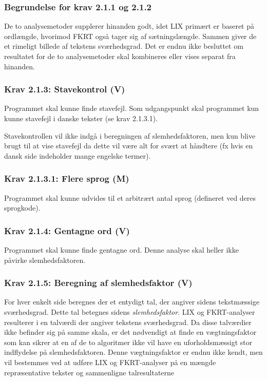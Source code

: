 \documentclass[a4paper,oneside,article]{memoir}
\begin{document}
\subsubsection{Begrundelse for krav 2.1.1 og 2.1.2}
De to analysemetoder supplerer hinanden godt, idet LIX primært er
baseret på ordlængde, hvorimod FKRT også tager sig af
sætningslængde. Sammen giver de et rimeligt billede af tekstens
sværhedsgrad. Det er endnu ikke besluttet om resultatet for de to
analysemetoder skal kombineres eller vises separat fra hinanden.

\subsubsection{Krav 2.1.3: Stavekontrol (V)}
Programmet skal kunne finde stavefejl. Som udgangspunkt skal
programmet kun kunne stavefejl i danske tekster (se krav 2.1.3.1).

Stavekontrollen vil ikke indgå i beregningen af slemhedsfaktoren, men kun
blive brugt til at vise stavefejl da dette vil være alt for
svært at håndtere (fx hvis en dansk side indeholder mange
engelske termer).

\subsubsection{Krav 2.1.3.1: Flere sprog (M)}
Programmet skal kunne udvides til et arbitrært antal sprog (defineret
ved deres sprogkode).

\subsubsection{Krav 2.1.4: Gentagne ord (V)}
Programmet skal kunne finde gentagne ord.
Denne analyse skal heller ikke påvirke slemhedsfaktoren.

\subsubsection{Krav 2.1.5: Beregning af slemhedsfaktor (V)}

For hver enkelt side beregnes der et entydigt tal, der angiver sidens
tekstmæssige sværhedsgrad. Dette tal betegnes sidens
\textit{slemhedsfaktor}. LIX og FKRT-analyser resulterer i en talværdi
der angiver tekstens sværhedsgrad. Da disse talværdier ikke befinder
sig på samme skala, er det nødvendigt at finde en vægtningsfaktor som
kan sikrer at en af de to algoritmer ikke vil have en uforholdsmæssigt
stor indflydelse på slemhedsfaktoren. Denne vægtningsfaktor er endnu
ikke kendt, men vil bestemmes ved at udføre LIX og FKRT-analyser på en
mængde repræsentative tekster og sammenligne talresultaterne
\end{document}

